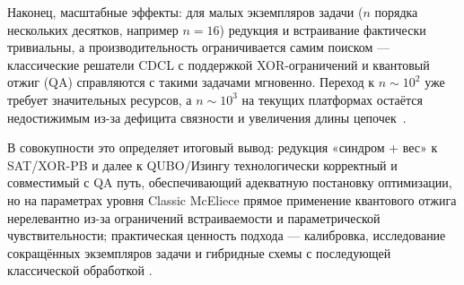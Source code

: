 Наконец, масштабные эффекты: для малых экземпляров задачи ($n$ порядка нескольких десятков, например $n=16$) редукция и встраивание фактически тривиальны, а производительность ограничивается самим поиском — классические решатели CDCL с поддержкой XOR-ограничений и квантовый отжиг (QA) справляются с такими задачами мгновенно. Переход к $n \sim 10^2$ уже требует значительных ресурсов, а $n \sim 10^3$ на текущих платформах остаётся недостижимым из-за дефицита связности и увеличения длины цепочек~\cite{Pei2025}.


В совокупности это определяет итоговый вывод: редукция «синдром + вес» к SAT/XOR-PB и далее к QUBO/Изингу технологически корректный и совместимый с QA путь, обеспечивающий адекватную постановку оптимизации, но на параметрах уровня Classic McEliece прямое применение квантового отжига нерелевантно из-за ограничений встраиваемости и параметрической чувствительности; практическая ценность подхода — калибровка, исследование сокращённых экземпляров задачи и гибридные схемы с последующей классической обработкой \cite{ClassicMcEliece2020,Im2025}.
